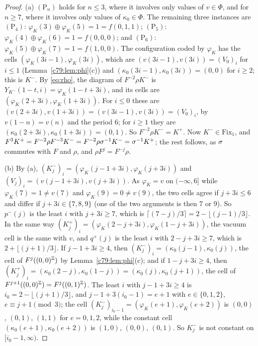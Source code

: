 \begin{proof}
(a) $(\mathrm P_n)$ holds for $n\le3$, where it involves only values of $v\in\Phi$, and for $n\ge7$, where it involves only values of $\kappa_0\in\Phi$. The remaining three instances are $(\mathrm P_4)$: $\varphi_K(3)\oplus\varphi_K(5)=1=f(0,1,1)$; $(\mathrm P_5)$: $\varphi_K(4)\oplus\varphi_K(6)=1=f(0,0,0)$; and $(\mathrm P_6)$: $\varphi_K(5)\oplus\varphi_K(7)=1=f(1,0,0)$. The configuration coded by $\varphi_K$ has the cells $(\varphi_K(3i-1),\varphi_K(3i))$, which are $(v(3i-1),v(3i))=(V_0)_i$ for $i\le1$ (Lemma~\ref{c79:lem:phi}(c)) and $(\kappa_0(3i-1),\kappa_0(3i))=(0,0)$ for $i\ge2$; this is $K^-$. By \eqref{eq:rho}, the diagram of $F^{-2}\rho K^-$ is $Y_{K^-}(1-t,i)=\varphi_K(1-t+3i)$, and its cells are $(\varphi_K(2+3i),\varphi_K(1+3i))$. For $i\le0$ these are $(v(2+3i),v(1+3i))=(v(3i-1),v(3i))=(V_0)_i$, by $v(1-n)=v(n)$ and the period $6$; for $i\ge1$ they are $(\kappa_0(2+3i),\kappa_0(1+3i))=(0,1)$. So $F^{-2}\rho K^-=K^+$. Now $K^-\in\mathrm{Fix}_1$, and $F^3K^+=F^{-2}\rho F^{-3}K^-=F^{-2}\rho\sigma^{-1}K^-=\sigma^{-1}K^+$; the rest follows, as $\sigma$ commutes with $F$ and $\rho$, and $\rho F^j=F^{-j}\rho$.

(b) By (a), $(K^-_j)_i=(\varphi_K(j-1+3i),\varphi_K(j+3i))$ and $(V_j)_i=(v(j-1+3i),v(j+3i))$. As $\varphi_K=v$ on $(-\infty,6]$ while $\varphi_K(7)=1\ne v(7)$ and $\varphi_K(9)=0\ne v(9)$, the two cells agree if $j+3i\le6$ and differ if $j+3i\in\{7,8,9\}$ (one of the two arguments is then $7$ or $9$). So $p^-(j)$ is the least $i$ with $j+3i\ge7$, which is $\lceil(7-j)/3\rceil=2-\lfloor(j-1)/3\rfloor$. In the same way $(K^+_j)_i=(\varphi_K(2-j+3i),\varphi_K(1-j+3i))$, the vacuum cell is the same with $v$, and $q^+(j)$ is the least $i$ with $2-j+3i\ge7$, which is $2+\lfloor(j+1)/3\rfloor$. If $j-1+3i\ge4$, then $(K^-_j)_i=(\kappa_0(j-1),\kappa_0(j))$, the cell of $F^j((0,0)^{\mathbb{Z}})$ by Lemma~\ref{c79:lem:phi}(c); and if $1-j+3i\ge4$, then $(K^+_j)_i=(\kappa_0(2-j),\kappa_0(1-j))=(\kappa_0(j),\kappa_0(j+1))$, the cell of $F^{j+1}((0,0)^{\mathbb{Z}})=F^j((0,1)^{\mathbb{Z}})$. The least $i$ with $j-1+3i\ge4$ is $i_0=2-\lfloor(j+1)/3\rfloor$, and $j-1+3(i_0-1)=e+1$ with $e\in\{0,1,2\}$, $e\equiv j+1\pmod 3$; the cell $(K^-_j)_{i_0-1}=(\varphi_K(e+1),\varphi_K(e+2))$ is $(0,0)$, $(0,1)$, $(1,1)$ for $e=0,1,2$, while the constant cell $(\kappa_0(e+1),\kappa_0(e+2))$ is $(1,0)$, $(0,0)$, $(0,1)$. So $K^-_j$ is not constant on $[i_0-1,\infty)$.


\end{proof}
